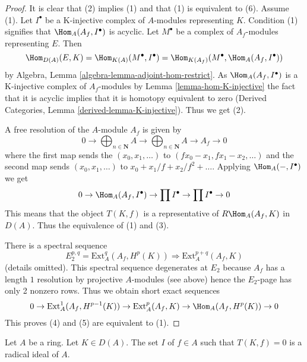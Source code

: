 \begin{proof}
It is clear that (2) implies (1) and that (1) is equivalent to (6). Assume (1).
Let $I^\bullet$ be a K-injective complex of $A$-modules representing $K$.
Condition (1) signifies that $\Hom_A(A_f, I^\bullet)$ is acyclic.
Let $M^\bullet$ be a complex of $A_f$-modules representing $E$.
Then
$$
\Hom_{D(A)}(E, K) =
\Hom_{K(A)}(M^\bullet, I^\bullet) =
\Hom_{K(A_f)}(M^\bullet, \Hom_A(A_f, I^\bullet))
$$
by Algebra, Lemma \ref{algebra-lemma-adjoint-hom-restrict}.
As $\Hom_A(A_f, I^\bullet)$ is a K-injective complex of
$A_f$-modules by Lemma \ref{lemma-hom-K-injective}
the fact that it is acyclic implies that it is homotopy equivalent to zero
(Derived Categories, Lemma \ref{derived-lemma-K-injective}).
Thus we get (2).

\medskip\noindent
A free resolution of the $A$-module $A_f$ is given by
$$
0 \to \bigoplus\nolimits_{n \in \mathbf{N}} A \to
\bigoplus\nolimits_{n \in \mathbf{N}} A
\to A_f \to 0
$$
where the first map sends the $(x_0, x_1, \ldots)$ to
$(fx_0 - x_1, fx_1 - x_2, \ldots)$ and the second map sends
$(x_0, x_1, \ldots)$ to $x_0 + x_1/f + x_2/f^2 + \ldots$.
Applying $\Hom_A(-, I^\bullet)$ we get
$$
0 \to \Hom_A(A_f, I^\bullet) \to \prod I^\bullet \to \prod I^\bullet \to 0
$$
This means that the object $T(K, f)$ is a representative of
$R\Hom_A(A_f, K)$ in $D(A)$. Thus the equivalence of (1) and (3).

\medskip\noindent
There is a spectral sequence
$$
E_2^{p, q} = \text{Ext}^q_A(A_f, H^p(K)) \Rightarrow
\text{Ext}^{p + q}_A(A_f, K)
$$
(details omitted). This spectral sequence degenerates at $E_2$ because
$A_f$ has a length $1$ resolution by projective $A$-modules (see above)
hence the $E_2$-page has only 2 nonzero rows. Thus we obtain short exact
sequences
$$
0 \to \text{Ext}^1_A(A_f, H^{p - 1}(K)) \to \text{Ext}^p_A(A_f, K)
\to \Hom_A(A_f, H^p(K)) \to 0
$$
This proves (4) and (5) are equivalent to (1).
\end{proof}

\begin{lemma}
\label{lemma-ideal-of-elements-complete-wrt}
Let $A$ be a ring. Let $K \in D(A)$. The set $I$ of $f \in A$ such that
$T(K, f) = 0$ is a radical ideal of $A$.
\end{lemma}

